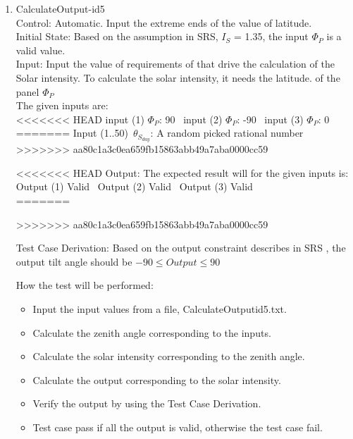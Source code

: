 \documentclass[12pt, titlepage]{article}
\begin{document}
\begin{enumerate}
 

\item{CalculateOutput-id5\\}
Control: Automatic. Input the extreme ends of the value of latitude.\\

Initial State: Based on the assumption in SRS\cite{YS2019}, $I_{S}$ = 1.35, the input 
$\Phi_P$ is a valid value.\\

Input: Input the value of requirements of \progname that drive the calculation
of the Solar intensity. To calculate the solar intensity, it needs the latitude. of the panel $\Phi_P$\\

The given inputs are:\\ 
<<<<<<< HEAD
input (1) $\Phi_P$: 90 
~input (2) $\Phi_P$: -90 
~input (3) $\Phi_P$: 0\\
=======
Input (1..50)~$\theta_{S_{day}}$: A random  picked rational number \\
>>>>>>> aa80c1a3c0ea659fb15863abb49a7aba0000cc59


<<<<<<< HEAD
Output: The expected result will for the given inputs is:\\ 
Output (1) Valid
~Output (2) Valid
~Output (3) Valid \\
=======

>>>>>>> aa80c1a3c0ea659fb15863abb49a7aba0000cc59



Test Case Derivation: Based on the output  constraint describes in SRS \cite{YS2019}, the 
output tilt angle should be $-90 \leq Output \leq 90$

How the test will be performed:
\begin{itemize}
\item Input the input values from a file, CalculateOutputid5.txt.
\item Calculate the zenith angle corresponding to the inputs.
\item Calculate the solar intensity corresponding to the zenith angle.
\item Calculate the output corresponding to the solar intensity.
\item Verify the output by using the Test Case Derivation.
\item Test case pass if all the output is valid,
otherwise the test case fail.
\end{itemize}
\end{enumerate}
\end{document}
